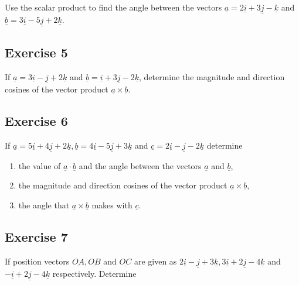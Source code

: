 \documentclass[
  english,
  11pt,
  oneside]{book}
\providecommand{\tightlist}{%
  \setlength{\itemsep}{0pt}\setlength{\parskip}{0pt}}
\newcommand{\slide}{}
\theoremstyle{definition}
\theoremstyle{definition}
\theoremstyle{definition}
\theoremstyle{definition}
\theoremstyle{remark}
\begin{document}
Use the scalar product to find the angle between the vectors \(\underline{a}=2\underline{i} + 3\underline{j} - \underline{k}\) and \(\underline{b}=3\underline{i} - 5\underline{j} + 2\underline{k}\).

\slide

\subsection*{Exercise 5}\label{exercise-5-8}

If \(\underline{a} = 3\underline{i} - \underline{j} + 2\underline{k}\) and \(\underline{b} = \underline{i} + 3\underline{j} - 2\underline{k}\), determine the magnitude and direction cosines of the vector product \(\underline{a} \times \underline{b}\).

\slide

\subsection*{Exercise 6}\label{exercise-6-6}

If \(\underline{a} = 5\underline{i} + 4\underline{j} + 2\underline{k}, \underline{b} = 4\underline{i} - 5\underline{j} + 3\underline{k}\) and \(\underline{c} = 2\underline{i} - \underline{j} - 2\underline{k}\) determine

\begin{enumerate}
\def\labelenumi{\roman{enumi}.}
\tightlist
\item
  the value of \(\underline{a} \cdot \underline{b}\) and the angle between the vectors \(\underline{a}\) and \(\underline{b}\),
\item
  the magnitude and direction cosines of the vector product \(\underline{a} \times \underline{b}\),
\item
  the angle that \(\underline{a} \times \underline{b}\) makes with \(\underline{c}\).
\end{enumerate}

\slide

\subsection*{Exercise 7}\label{exercise-7-3}

If position vectors \(\underline{OA}, \underline{OB}\) and \(\underline{OC}\) are given as \(2\underline{i} - \underline{j} + 3\underline{k}, 3\underline{i} + 2\underline{j} - 4\underline{k}\) and \(-\underline{i} + 2\underline{j} - 4\underline{k}\) respectively. Determine
\end{document}
